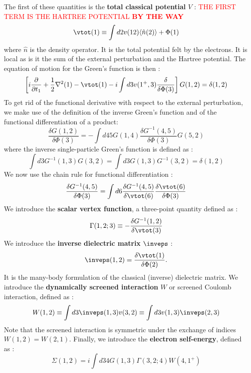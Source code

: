 The first of these quantities is the \textbf{total classical potential} $V$ : \textcolor{red}{\textsc{THE FIRST TERM IS THE HARTREE POTENTIAL} \textbf{BY THE WAY}}
\begin{equation}
	\vtot (1) \equiv \int d2 v(12) \langle \hat{n}(2) \rangle + \Phi(1) \label{eq:vtot}
\end{equation}
where $\hat{n}$ is the density operator. It is the total potential felt by the electrons. It is local as is it the sum of the external perturbation and the Hartree potential. The equation of motion for the Green's function is then :
\begin{equation}
	\left[ i \frac{\partial}{\partial t_1} + \frac{1}{2}\nabla^2(1) - \vtot (1) -i\int d3 v(1^+,3) \frac{\delta}{\delta \Phi(3)} \right] G(1,2) = \delta(1,2) \label{eq:GF_EOM}
\end{equation}
To get rid of the functional derivative with respect to the external perturbation, we make use of the definition of the inverse Green's function and of the functional differentiation of a product:
\begin{equation}
	\frac{\delta G(1,2)}{\delta \Phi(3)} = - \int d45 G(1,4) \frac{\delta G^{-1}(4,5)}{\delta \Phi(3)} G(5,2)
\end{equation}
where the inverse single-particle Green's function is defined as :
\begin{equation}
	\int d3 G^{-1}(1,3) G(3,2) = \int d3 G(1,3)G^{-1}(3,2) = \delta(1,2) \label{eq:inv_GF}
\end{equation}
We now use the chain rule for functional differentiation :
\begin{equation}
	\frac{\delta G^{-1}(4,5)}{\delta \Phi(3)} = \int d6 \frac{\delta G^{-1}(4,5)}{\delta \vtot(6)} \frac{\delta \vtot(6)}{\delta \Phi(3)}
\end{equation}
We introduce the \textbf{scalar vertex function}, a three-point quantity defined as :
\begin{equation}
	\Gamma(1,2;3) \equiv -\frac{\delta G^{-1}(1,2)}{\delta \vtot(3)} \label{eq:vertex}
\end{equation}
We introduce the \textbf{inverse dielectric matrix} $\inveps$ :
\begin{equation}
	\inveps(1,2) = \frac{\delta \vtot(1)}{\delta \Phi(2)}.
\end{equation} 
It is the many-body formulation of the classical (inverse) dielectric matrix. 
We introduce the \textbf{dynamically screened interaction} $W$ or screened Coulomb interaction, defined as :
\begin{equation}
	W(1,2) \equiv \int d3 \inveps(1,3) v(3,2) \equiv \int d3 v(1,3) \inveps(2,3)
\end{equation}
Note that the screened interaction is symmetric under the exchange of indices $W(1,2) = W(2,1)$.
Finally, we introduce the \textbf{electron self-energy}, defined as :
\begin{equation}
	\Sigma(1,2) = i \int d34 G(1,3) \Gamma(3,2;4) W(4,1^+)
\end{equation}
%

